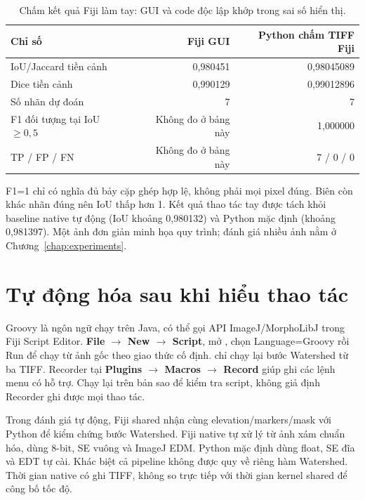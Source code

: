 \begin{table}[htbp]\centering\small
\caption{Chấm kết quả Fiji làm tay: GUI và code độc lập khớp trong sai số hiển thị.}\label{tab:manual-metrics}
\begin{tabularx}{\linewidth}{X r r}\toprule
Chỉ số & Fiji GUI & Python chấm TIFF Fiji\\\midrule
IoU/Jaccard tiền cảnh & 0,980451 & 0,98045089\\
Dice tiền cảnh & 0,990129 & 0,99012896\\
Số nhãn dự đoán & 7 & 7\\
F1 đối tượng tại IoU $\geq 0,5$ & Không đo ở bảng này & 1,000000\\
TP / FP / FN & Không đo ở bảng này & 7 / 0 / 0\\\bottomrule
\end{tabularx}\end{table}
F1=1 chỉ có nghĩa đủ bảy cặp ghép hợp lệ, không phải mọi pixel đúng. Biên còn khác nhãn đúng nên IoU thấp hơn 1. Kết quả thao tác tay được tách khỏi baseline native tự động (IoU khoảng 0,980132) và Python mặc định (khoảng 0,981397). Một ảnh đơn giản minh họa quy trình; đánh giá nhiều ảnh nằm ở Chương~\ref{chap:experiments}.

\section{Tự động hóa sau khi hiểu thao tác}
Groovy là ngôn ngữ chạy trên Java, có thể gọi API ImageJ/MorphoLibJ trong Fiji Script Editor. \textbf{File $\to$ New $\to$ Script}, mở , chọn Language=Groovy rồi Run để chạy từ ảnh gốc theo giao thức cố định.  chỉ chạy lại bước Watershed từ ba TIFF. Recorder tại \textbf{Plugins $\to$ Macros $\to$ Record} giúp ghi các lệnh menu có hỗ trợ. Chạy lại trên bản sao để kiểm tra script, không giả định Recorder ghi được mọi thao tác.

Trong đánh giá tự động, Fiji shared nhận cùng elevation/markers/mask với Python để kiểm chứng bước Watershed. Fiji native tự xử lý từ ảnh xám chuẩn hóa, dùng 8-bit, SE vuông và ImageJ EDM. Python mặc định dùng float, SE đĩa và EDT tự cài. Khác biệt cả pipeline không được quy về riêng hàm Watershed. Thời gian native có ghi TIFF, không so trực tiếp với thời gian kernel shared để công bố tốc độ.
